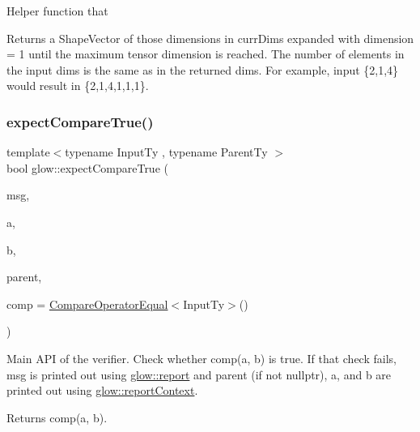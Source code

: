 Helper function that \begin{DoxyReturn}{Returns}
a Shape\+Vector of those dimensions in {\ttfamily curr\+Dims} expanded with dimension = 1 until the maximum tensor dimension is reached. The number of elements in the input dims is the same as in the returned dims. For example, input \{2,1,4\} would result in \{2,1,4,1,1,1\}. 
\end{DoxyReturn}
\mbox{\label{namespaceglow_afd8e77c649bf3668467058ae071bb875}} 
\subsubsection{\texorpdfstring{expect\+Compare\+True()}{expectCompareTrue()}\hspace{0.1cm}{\footnotesize\ttfamily [1/2]}}
{\footnotesize\ttfamily template$<$typename Input\+Ty , typename Parent\+Ty $>$ \\
bool glow\+::expect\+Compare\+True (\begin{DoxyParamCaption}\item[{const char $\ast$}]{msg,  }\item[{const Input\+Ty \&}]{a,  }\item[{const Input\+Ty \&}]{b,  }\item[{const Parent\+Ty $\ast$}]{parent,  }\item[{const \hyperlink{structglow_1_1_compare_with_name}{Compare\+With\+Name}$<$ Input\+Ty $>$ \&}]{comp = {\ttfamily \hyperlink{structglow_1_1_compare_operator_equal}{Compare\+Operator\+Equal}$<$InputTy$>$()} }\end{DoxyParamCaption})}

Main A\+PI of the verifier. Check whether {\ttfamily comp}({\ttfamily a}, {\ttfamily b}) is true. If that check fails, {\ttfamily msg} is printed out using \hyperlink{namespaceglow_a9d164b45d9fb735f448cd7985bcdf203}{glow\+::report} and {\ttfamily parent} (if not nullptr), {\ttfamily a}, and {\ttfamily b} are printed out using \hyperlink{namespaceglow_a5efbd9d8157489eb3b55e5c9fafb5fb7}{glow\+::report\+Context}. \begin{DoxyReturn}{Returns}
{\ttfamily comp}({\ttfamily a}, {\ttfamily b}). 
\end{DoxyReturn}
\mbox{\label{namespaceglow_a77a6fef6be3a014626580088a1a72842}} 
